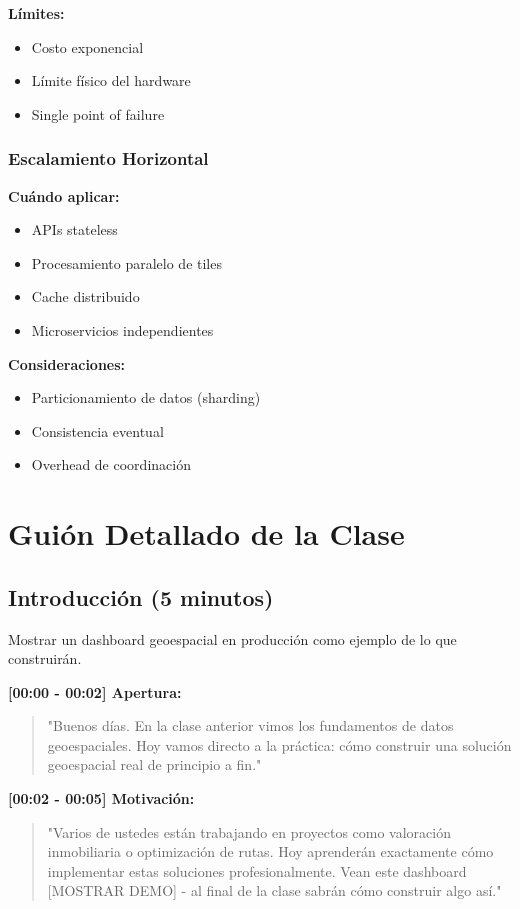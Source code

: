 \documentclass[11pt,a4paper]{article}
\begin{document}
\textbf{Límites:}
\begin{itemize}
    \item Costo exponencial
    \item Límite físico del hardware
    \item Single point of failure
\end{itemize}

\subsubsection{Escalamiento Horizontal}
\textbf{Cuándo aplicar:}
\begin{itemize}
    \item APIs stateless
    \item Procesamiento paralelo de tiles
    \item Cache distribuido
    \item Microservicios independientes
\end{itemize}

\textbf{Consideraciones:}
\begin{itemize}
    \item Particionamiento de datos (sharding)
    \item Consistencia eventual
    \item Overhead de coordinación
\end{itemize}

\section{Guión Detallado de la Clase}

\subsection{Introducción (5 minutos)}

\begin{demobox}
Mostrar un dashboard geoespacial en producción como ejemplo de lo que construirán.
\end{demobox}

\textbf{[00:00 - 00:02] Apertura:}
\begin{quote}
    "Buenos días. En la clase anterior vimos los fundamentos de datos geoespaciales. Hoy vamos directo a la práctica: cómo construir una solución geoespacial real de principio a fin."
\end{quote}

\textbf{[00:02 - 00:05] Motivación:}
\begin{quote}
    "Varios de ustedes están trabajando en proyectos como valoración inmobiliaria o optimización de rutas. Hoy aprenderán exactamente cómo implementar estas soluciones profesionalmente. Vean este dashboard [MOSTRAR DEMO] - al final de la clase sabrán cómo construir algo así."
\end{quote}
\end{document}

